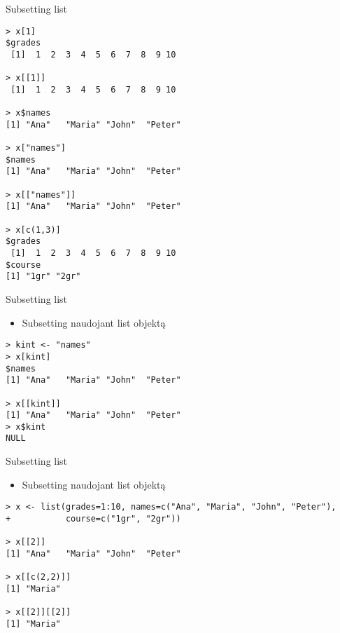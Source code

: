 \documentclass[11pt,xcolor=table]{beamer}
\begin{document}
\begin{frame}[fragile]{Subsetting list}
\begin{lstlisting}
> x[1]
$grades
 [1]  1  2  3  4  5  6  7  8  9 10

> x[[1]]
 [1]  1  2  3  4  5  6  7  8  9 10

> x$names
[1] "Ana"   "Maria" "John"  "Peter"

> x["names"]
$names
[1] "Ana"   "Maria" "John"  "Peter"

> x[["names"]]
[1] "Ana"   "Maria" "John"  "Peter"

> x[c(1,3)]
$grades
 [1]  1  2  3  4  5  6  7  8  9 10
$course
[1] "1gr" "2gr"
\end{lstlisting}
\end{frame}

\begin{frame}[fragile]{Subsetting list}
\begin{itemize}
\item Subsetting naudojant list objektą
\end{itemize}
\begin{lstlisting}
> kint <- "names"
> x[kint]
$names
[1] "Ana"   "Maria" "John"  "Peter"

> x[[kint]]
[1] "Ana"   "Maria" "John"  "Peter"
> x$kint
NULL
\end{lstlisting}
\end{frame}


\begin{frame}[fragile]{Subsetting list}
\begin{itemize}
\item Subsetting naudojant list objektą
\end{itemize}
\begin{lstlisting}
> x <- list(grades=1:10, names=c("Ana", "Maria", "John", "Peter"), 
+           course=c("1gr", "2gr"))

> x[[2]]
[1] "Ana"   "Maria" "John"  "Peter"

> x[[c(2,2)]]
[1] "Maria"

> x[[2]][[2]]
[1] "Maria"
\end{lstlisting}
\end{frame}
\end{document}
